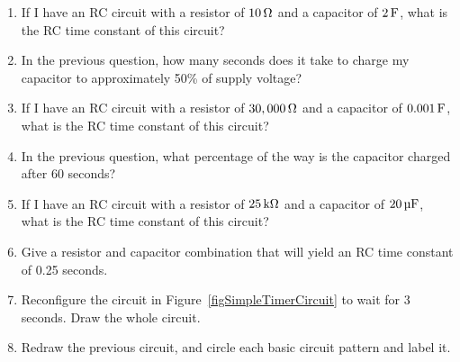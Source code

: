 
\begin{enumerate}
\item If I have an RC circuit with a resistor of $10\,\si{\ohm}$ and a capacitor of $2\,\si{\farad}$, what is the RC time constant of this circuit?
\item In the previous question, how many seconds does it take to charge my capacitor to approximately 50\% of supply voltage?
\item If I have an RC circuit with a resistor of $30,000\,\si{\ohm}$ and a capacitor of $0.001\,\si{\farad}$, what is the RC time constant of this circuit?
\item In the previous question, what percentage of the way is the capacitor charged after 60 seconds?
\item If I have an RC circuit with a resistor of $25\,\si{\kilo\ohm}$ and a capacitor of $20\,\si{\micro\farad}$, what is the RC time constant of this circuit?
\item Give a resistor and capacitor combination that will yield an RC time constant of 0.25 seconds.
\item Reconfigure the circuit in Figure~\ref{figSimpleTimerCircuit} to wait for 3 seconds.  Draw the whole circuit.
\item Redraw the previous circuit, and circle each basic circuit pattern and label it.
\end{enumerate}

